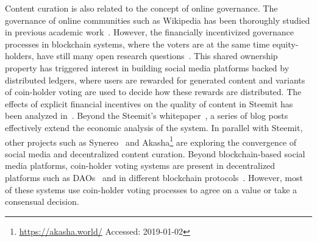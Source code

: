  Content curation is also related to the concept of online governance. The
  governance of online communities such as Wikipedia has been thoroughly studied
  in previous academic work~\cite{leskovec2010governance,forte2008scaling}.
  However, the financially incentivized governance processes in blockchain
  systems, where the voters are at the same time equity-holders, have still many
  open research questions~\cite{vitalik,ehrsam}. This shared ownership property
  has triggered interest in building social media platforms backed by
  distributed ledgers, where users are rewarded for generated content and
  variants of coin-holder voting are used to decide how these rewards are
  distributed. The effects of explicit financial incentives on the quality of
  content in Steemit has been analyzed in~\cite{thelwall2017can}. Beyond the
  Steemit's whitepaper~\cite{steemit}, a series of blog
  posts~\cite{curationRewards,selfvoters} effectively extend the economic
  analysis of the system. In parallel with Steemit, other projects such as
  Synereo~\cite{synereo} and Akasha\footnote{\url{https://akasha.world/}
  Accessed: 2019-01-02} are exploring the convergence of social media and
  decentralized content curation. Beyond blockchain-based social media
  platforms, coin-holder voting systems are present in decentralized platforms
  such as DAOs~\cite{darkdaos} and in different blockchain
  protocols~\cite{dash,tezos}. However, most of these systems use coin-holder
  voting processes to agree on a value or take a consensual decision.

